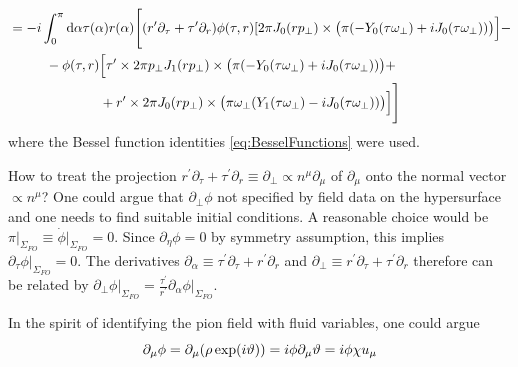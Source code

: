 \begin{subequations}
\begin{align}
                              & =-{i}\int_0^\pi\text{d}\alpha\tau(\alpha) r(\alpha)\Bigg[(r^\prime\partial_\tau+\tau^\prime\partial_r)\phi(\tau,r)[2\pi J_0(r p_\perp)\times\big(\pi(-Y_0(\tau\omega_\perp)+{i} J_0(\tau\omega_\perp))\big)\Big]-\nonumber                                        \\
                              & \phantom{=}\qquad - \phi(\tau,r)\Big[\tau^\prime\times2\pi p_\perp J_1(r p_\perp)\times\big(\pi(-Y_0(\tau\omega_\perp)+{i} J_0(\tau\omega_\perp))\big)+\nonumber                                                                                                \\
                              & \phantom{=}\qquad\phantom{-\phi(\tau,r)\Big[}+r^\prime\times2\pi J_0(r p_\perp)\times\big(\pi\omega_\perp(Y_1(\tau\omega_\perp)-{i} J_0(\tau\omega_\perp))\big)\Big]\Bigg]
    \end{align}
\end{subequations}
where the Bessel function identities \eqref{eq:BesselFunctions} were used.

How to treat the projection $r^\prime\partial_\tau+\tau^\prime\partial_r\equiv\partial_\perp\propto n^\mu\partial_\mu$ of $\partial_\mu$ onto the normal vector $\propto n^\mu$? One could argue that $\partial_\perp\phi$ not specified by field data on the hypersurface and one needs to find suitable initial conditions. A reasonable choice would be $\pi\vert_{\Sigma_{FO}}\equiv\dot{\phi}\vert_{\Sigma_{FO}}=0$. Since $\partial_\eta\phi=0$ by symmetry assumption, this implies $\partial_\tau\phi\vert_{\Sigma_{FO}}=0$. The derivatives $\partial_\alpha\equiv\tau^\prime\partial_\tau+r^\prime\partial_r$ and $\partial_\perp\equiv r^\prime\partial_\tau+\tau^\prime\partial_r$ therefore can be related by $\partial_\perp\phi\vert_{\Sigma_{FO}}=\frac{\tau^\prime}{r^\prime}\partial_\alpha\phi\vert_{\Sigma_{FO}}$.

In the spirit of identifying the pion field with fluid variables, one could argue
\begin{equation}
    \partial_\mu\phi=\partial_\mu(\rho\exp({i}\vartheta))={i}\phi\partial_\mu\vartheta={i}\phi\chi u_\mu
\end{equation}
